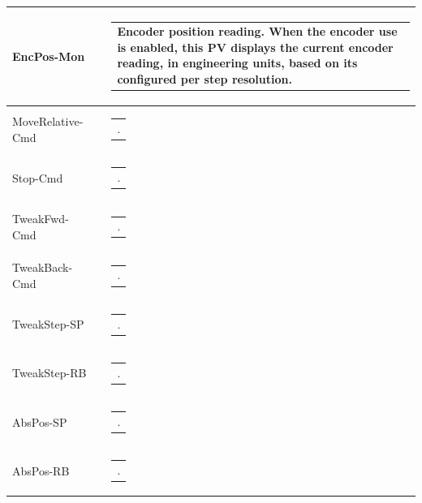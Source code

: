 \documentclass[openany]{article}
\begin{document}
\begin{longtable}{| m{4.5cm} m{2.5cm}  m{8.5cm} |}
        EncPos-Mon &  & \begin{tabular}{@{}m{6cm}@{}}
                Encoder position reading. When the encoder use is enabled, this PV displays the current encoder reading, in engineering units, based on its configured per step resolution.
            \end{tabular} \hypertarget{pv:move-relative-cmd}{}\\ \hline
        MoveRelative-Cmd &  & \begin{tabular}{@{}m{6cm}@{}}
                .
            \end{tabular} \hypertarget{pv:stop-cmd}{}\\ \hline
        Stop-Cmd &  & \begin{tabular}{@{}m{6cm}@{}}
                .
            \end{tabular} \hypertarget{pv:tweak-fwd-cmd}{}\\ \hline
        TweakFwd-Cmd &  & \begin{tabular}{@{}m{6cm}@{}}
                .
            \end{tabular} \hypertarget{pv:tweak-back-cmd}{}\\ \hline
        TweakBack-Cmd &  & \begin{tabular}{@{}m{6cm}@{}}
                .
            \end{tabular} \hypertarget{pv:tweak-step}{}\\ \hline
        TweakStep-SP &  & \begin{tabular}{@{}m{6cm}@{}}
                .
            \end{tabular} \hypertarget{}{}\\ \hline
        TweakStep-RB &  & \begin{tabular}{@{}m{6cm}@{}}
                .
            \end{tabular} \hypertarget{pv:abs-pos}{}\\ \hline
        AbsPos-SP &  & \begin{tabular}{@{}m{6cm}@{}}
                .
            \end{tabular} \hypertarget{}{}\\ \hline
        AbsPos-RB &  & \begin{tabular}{@{}m{6cm}@{}}
                .
            \end{tabular} \hypertarget{pv:mtr-on-macro-cte}{}\\ \hline

\end{longtable}
\end{document}
